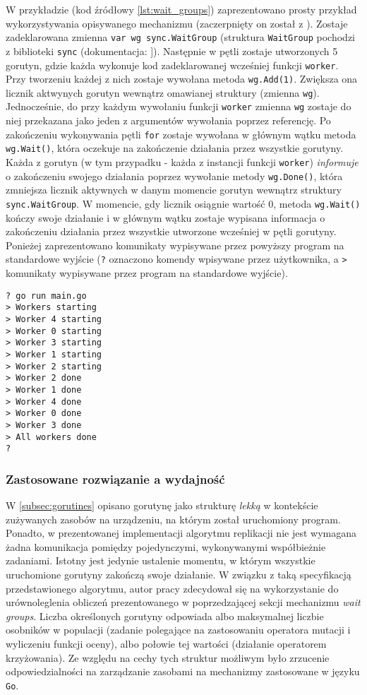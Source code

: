 W przykładzie (kod źródłowy \ref{lst:wait_groups}) zaprezentowano prosty przykład wykorzystywania opisywanego mechanizmu (zaczerpnięty on został z \cite{GoDocsWaitGroups}). Zostaje zadeklarowana zmienna \texttt{var wg sync.WaitGroup} (struktura \texttt{WaitGroup} pochodzi z biblioteki \texttt{sync} (dokumentacja: \cite{GoDocsSync}]). Następnie w pętli zostaje utworzonych 5 gorutyn, gdzie każda wykonuje kod zadeklarowanej wcześniej funkcji \texttt{worker}. Przy tworzeniu każdej z nich zostaje wywołana metoda \texttt{wg.Add(1)}. Zwiększa ona licznik aktwynych gorutyn wewnątrz omawianej struktury (zmienna \texttt{wg}). Jednocześnie, do przy każdym wywołaniu funkcji \texttt{worker} zmienna \texttt{wg} zostaje do niej przekazana jako jeden z argumentów wywołania poprzez referencję. Po zakończeniu wykonywania pętli \texttt{for} zostaje wywołana w głównym wątku metoda \texttt{wg.Wait()}, która oczekuje na zakończenie działania przez wszystkie gorutyny. Każda z gorutyn (w tym przypadku - każda z instancji funkcji \texttt{worker}) \textit{informuje} o zakończeniu swojego działania poprzez wywołanie metody \texttt{wg.Done()}, która zmniejsza licznik aktywnych w danym momencie gorutyn wewnątrz struktury \texttt{sync.WaitGroup}. W momencie, gdy licznik osiągnie wartość 0, metoda \texttt{wg.Wait()} kończy swoje działanie i w głównym wątku zostaje wypisana informacja o zakończeniu działania przez wszystkie utworzone wcześniej w pętli gorutyny. Ponieżej zaprezentowano komunikaty wypisywane przez powyższy program na standardowe wyjście (\texttt{?} oznaczono komendy wpisywane przez użytkownika, a \texttt{>} komunikaty wypisywane przez program na standardowe wyjście).

\begin{verbatim}
? go run main.go
> Workers starting
> Worker 4 starting
> Worker 0 starting
> Worker 3 starting
> Worker 1 starting
> Worker 2 starting
> Worker 2 done
> Worker 1 done
> Worker 4 done
> Worker 0 done
> Worker 3 done
> All workers done
?
\end{verbatim}

\subsubsection{Zastosowane rozwiązanie a wydajność}
W \ref{subsec:gorutines} opisano gorutynę jako strukturę \textit{lekką} w kontekście zużywanych zasobów na urządzeniu, na którym został uruchomiony program. Ponadto, w prezentowanej implementacji algorytmu replikacji nie jest wymagana żadna komunikacja pomiędzy pojedynczymi, wykonywanymi współbieżnie zadaniami. Istotny jest jedynie ustalenie momentu, w którym wszystkie uruchomione gorutyny zakończą swoje działanie. W związku z taką specyfikacją przedstawionego algorytmu, autor pracy zdecydował się na wykorzystanie do urównoleglenia obliczeń prezentowanego w poprzedzającej sekcji mechanizmu \textit{wait groups}. Liczba określonych gorutyny odpowiada albo maksymalnej liczbie osobników w populacji (zadanie polegające na zastosowaniu operatora mutacji i wyliczeniu funkcji oceny), albo połowie tej wartości (działanie operatorem krzyżowania). Ze względu na cechy tych struktur możliwym było zrzucenie odpowiedzialności na zarządzanie zasobami na mechanizmy zastosowane w języku \texttt{Go}. 

